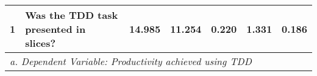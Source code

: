 \begin{table}[h]
{\begin{tabular}{|llrrrrr}
\multicolumn{1}{|l|}{\multirow{-13}{*}{1}}             & \multicolumn{1}{l|}{Was the TDD task presented in slices?}                                              & \multicolumn{1}{r|}{14.985}                         & \multicolumn{1}{r|}{11.254}                       & \multicolumn{1}{r|}{0.220}                              & \multicolumn{1}{r|}{1.331}                         & \multicolumn{1}{r|}{0.186}                           \\ \hline
\multicolumn{7}{|l}{\textit{a. Dependent Variable: Productivity achieved using TDD}}                                                                                                                                                                                                                                                                                                                                                             \\ \hline
\end{tabular}
}
\end{table}